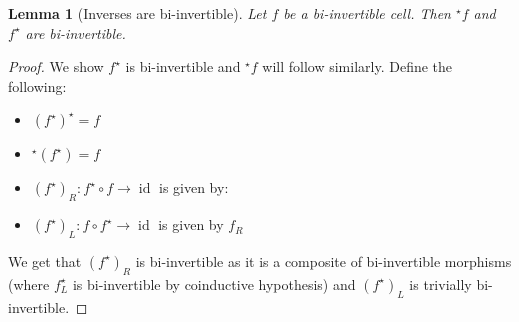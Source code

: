 \documentclass{article}
\newtheorem{lemma}{Lemma}
\theoremstyle{definition}
\theoremstyle{examplestyle}
\DeclareMathOperator{\id}{id}
\newcommand{\linv}[1]{{}^\star\!#1}
\newcommand{\rinv}[1]{#1^\star}
\begin{document}
\begin{lemma}[Inverses are bi-invertible]
  \label{lem:inverses}
  Let \(f\) be a bi-invertible cell. Then \(\linv f\) and \(\rinv f\) are bi-invertible.
\end{lemma}
\begin{proof}
  We show \(\rinv f\) is bi-invertible and \(\linv f\) will follow similarly. Define the following:
  \begin{itemize}
  \item \(\rinv {(\rinv f)} = f\)
  \item \(\linv {(\rinv f)} = f\)
  \item \((\rinv f)_R: \rinv f \circ f \to \id\) is given by:
    \begin{center}
    \end{center}
  \item \((\rinv f)_L: f \circ \rinv f \to \id\) is given by \(f_R\)
  \end{itemize}
  We get that \((\rinv f)_R\) is bi-invertible as it is a composite of bi-invertible morphisms (where \(\rinv {f_L}\) is bi-invertible by coinductive hypothesis) and \((\rinv f)_L\) is trivially bi-invertible.
\end{proof}
\end{document}
